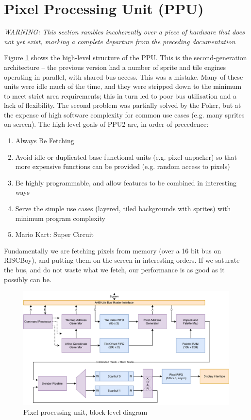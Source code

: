 \section{Pixel Processing Unit (PPU)}

{\it WARNING: This section rambles incoherently over a piece of hardware that does not yet exist, marking a complete departure from the preceding documentation}

Figure \ref{diagram:ppu_block} shows the high-level structure of the PPU. This is the second-generation architecture -- the previous version had a number of sprite and tile engines operating in parallel, with shared bus access. This was a mistake. Many of these units were idle much of the time, and they were stripped down to the minimum to meet strict area requirements; this in turn led to poor bus utilisation and a lack of flexibility. The second problem was partially solved by the Poker, but at the expense of high software complexity for common use cases (e.g. many sprites on screen). The high level goals of PPU2 are, in order of precedence:

\begin{enumerate}
\item Always Be Fetching
\item Avoid idle or duplicated base functional units (e.g. pixel unpacker) so that more expensive functions can be provided (e.g. random access to pixels)
\item Be highly programmable, and allow features to be combined in interesting ways
\item Serve the simple use cases (layered, tiled backgrounds with sprites) with minimum program complexity
\item Mario Kart: Super Circuit
\end{enumerate}

Fundamentally we are fetching pixels from memory (over a 16 bit bus on RISCBoy), and putting them on the screen in interesting orders. If we saturate the bus, and do not waste what we fetch, our performance is as good as it possibly can be.

\begin{figure}[H]
\centering
\caption{Pixel processing unit, block-level diagram}
\label{diagram:ppu_block}
\includegraphics[width=\textwidth]{diagrams/ppu_block.pdf}
\end{figure}

